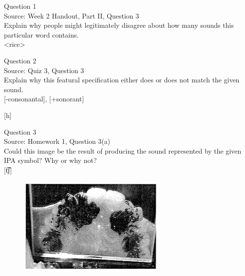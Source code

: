 \documentclass[12pt]{article}
\begin{document}
\begin{center}
\textbf{{\color{violet}{\HUGE 20201029 Thursday\\}}}

\textbf{{\color{violet}{\HUGE ALL EXAMS\\}}}

\end{center}
\newpage

\begin{center}
\textbf{{\color{blue}{\HUGE START OF EXAM\\}}}

\textbf{{\color{blue}{\HUGE Student ID: 55466\\}}}

\textbf{{\color{blue}{\HUGE \\}}}

\end{center}
\newpage

{\large Question 1}\\

Source: Week 2 Handout, Part II, Question 3\\

Explain why people might legitimately disagree about how many sounds this particular word contains.\\

<rice>


\newpage

{\large Question 2}\\

Source: Quiz 3, Question 3\\

Explain why this featural specification either does or does not match the given sound.\\

{[-consonantal]}, {[+sonorant]}

{[h]}


\newpage

{\large Question 3}\\

Source: Homework 1, Question 3(a)\\

Could this image be the result of producing the sound represented by the given IPA symbol? Why or why not?\\

{[t͡ʃ]}

\begin{figure}[H]
\includegraphics{../images/staticpalatography_fricative.png}
\end{figure}
\end{document}

